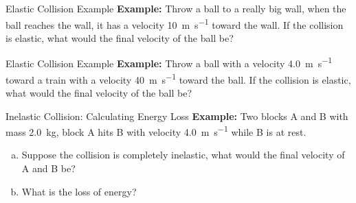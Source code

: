 \documentclass[12pt,compress,aspectratio=169]{beamer}
\begin{document}
\begin{frame}{Elastic Collision Example}
  \textbf{Example:} Throw a ball to a really big wall, when the ball reaches
  the wall, it has a velocity \SI{10}{\metre\per\second} toward the wall. If
  the collision is elastic, what would the final velocity of the ball be?
\end{frame}



\begin{frame}{Elastic Collision Example}
  \textbf{Example:} Throw a ball with a velocity \SI{4.0}{\metre\per\second}
  toward a train with a velocity \SI{40}{\metre\per\second} toward the ball.
  If the collision is elastic, what would the final velocity of the ball be?
\end{frame}


\begin{frame}{Inelastic Collision: Calculating Energy Loss}
  \textbf{Example:} Two blocks A and B with mass \SI{2.0}{\kilo\gram}, block
  A hits B with velocity \SI{4.0}{\metre\per\second} while B is at rest.
  \begin{enumerate}[(a)]
  \item Suppose the collision is completely inelastic, what would the final
    velocity of A and B be?
  \item What is the loss of energy?
  \end{enumerate}
\end{frame}
\end{document}
